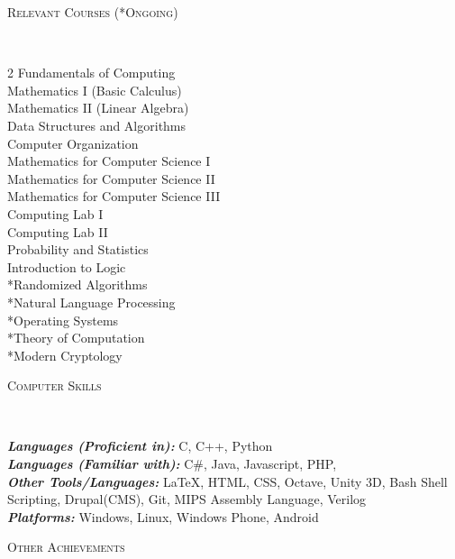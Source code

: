 \documentclass[9pt]{article}
\newenvironment{changemargin}[2]{%
  \begin{list}{}{%
    \setlength{\topsep}{0pt}%
    \setlength{\leftmargin}{#1}%
    \setlength{\rightmargin}{#2}%
    \setlength{\listparindent}{\parindent}%
    \setlength{\itemindent}{\parindent}%
    \setlength{\parsep}{\parskip}%
  }%
  \item[]}{\end{list}
}
\newcommand{\lineover}{
	\begin{changemargin}{-0.05in}{-0.10in}
		\vspace*{-8pt}
		\hrulefill \\
		\vspace*{-2pt}
	\end{changemargin}
}
\newcommand{\header}[1]{
	\begin{changemargin}{-0.75in}{-0.75in}
		\scshape{#1}\\
  	\lineover
	\end{changemargin}
}
\newenvironment{body} {
	\vspace*{-16pt}
	\begin{changemargin}{-0.6in}{-0.65in}
  }	
	{\end{changemargin}
}
\begin{document}
\header{Relevant Courses (*Ongoing)}

\begin{body}
	\vspace{4pt}
	\begin{multicols}{2}
	Fundamentals of Computing\\
	Mathematics I (Basic Calculus)\\	
	Mathematics II (Linear Algebra)\\
	Data Structures and Algorithms\\ 
	Computer Organization\\
	Mathematics for Computer Science I\\	
	Mathematics for Computer Science II\\	
	Mathematics for Computer Science III\\	
	Computing Lab I\\
	Computing Lab II\\
	Probability and Statistics\\
	Introduction to Logic\\
	*Randomized Algorithms\\
	*Natural Language Processing\\
	*Operating Systems\\
	*Theory of Computation\\
	*Modern Cryptology
	
	\end{multicols}
\end{body}

\header{Computer Skills}

\begin{body}
	\vspace{14pt}
	\emph{\textbf{Languages (Proficient in):}}{} C, C++, Python\\
	\emph{\textbf{Languages (Familiar with):}}{} C\#, Java, Javascript, PHP, \\
	\emph{\textbf{Other Tools/Languages:}}{}  \LaTeX , HTML, CSS, Octave, Unity 3D, Bash Shell Scripting, Drupal(CMS), Git, MIPS Assembly Language, Verilog\\
	\emph{\textbf{Platforms:}}{} Windows, Linux, Windows Phone, Android
\end{body}

\header{Other Achievements}
\end{document}
